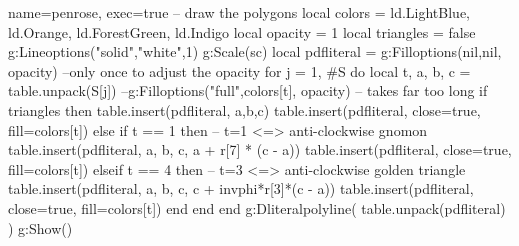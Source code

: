 \documentclass[tikz]{standalone}
\begin{document}
\begin{luadraw}{name=penrose, exec=true}
-- draw the polygons
local colors = {ld.LightBlue, ld.Orange, ld.ForestGreen, ld.Indigo}
local opacity = 1
local triangles = false
g:Lineoptions("solid","white",1)
g:Scale(sc)
local pdfliteral = {}
g:Filloptions(nil,nil, opacity) --only once to adjust the opacity
for j = 1, #S do
    local t, a, b, c = table.unpack(S[j])
    --g:Filloptions("full",colors[t], opacity) -- takes far too long
    if triangles then
        table.insert(pdfliteral, {a,b,c})
        table.insert(pdfliteral, {close=true, fill=colors[t]})
    else
        if t == 1 then -- t=1 <=> anti-clockwise gnomon
            table.insert(pdfliteral, {a, b, c, a + r[7] * (c - a)})
            table.insert(pdfliteral, {close=true, fill=colors[t]})
        elseif t == 4 then -- t=3 <=> anti-clockwise golden triangle
            table.insert(pdfliteral, {a, b, c, c + invphi*r[3]*(c - a)})
            table.insert(pdfliteral, {close=true, fill=colors[t]})
        end
    end
end
g:Dliteralpolyline( table.unpack(pdfliteral) )
g:Show()
\end{luadraw}

%
\end{document}
